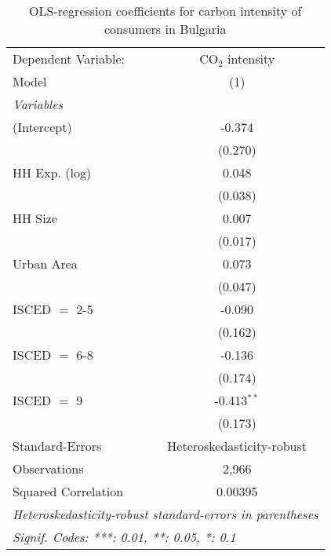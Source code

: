 
\begin{table}[htbp!]
   \centering
   \small
   \begin{adjustbox}{width = 1\textwidth, max height = 0.95\textheight, center}
      \begin{threeparttable}[b]
         \caption{\label{tab:OLS_1_BGR} OLS-regression coefficients for carbon intensity of consumers in Bulgaria}
         \begin{tabular}{lc}
            \tabularnewline \midrule \midrule
            Dependent Variable: & CO$_{2}$ intensity\\  
            Model               & (1)\\  
            \midrule
            \emph{Variables}\\
            (Intercept)         & -0.374\\   
                                & (0.270)\\   
            HH Exp. (log)       & 0.048\\   
                                & (0.038)\\   
            HH Size             & 0.007\\   
                                & (0.017)\\   
            Urban Area          & 0.073\\   
                                & (0.047)\\   
            ISCED $=$ 2-5       & -0.090\\   
                                & (0.162)\\   
            ISCED $=$ 6-8       & -0.136\\   
                                & (0.174)\\   
            ISCED $=$ 9         & -0.413$^{**}$\\   
                                & (0.173)\\   
            \midrule 
            Standard-Errors     & Heteroskedasticity-robust \\   
            Observations        & 2,966\\  
            Squared Correlation & 0.00395\\  
            \midrule \midrule
            \multicolumn{2}{l}{\emph{Heteroskedasticity-robust standard-errors in parentheses}}\\
            \multicolumn{2}{l}{\emph{Signif. Codes: ***: 0.01, **: 0.05, *: 0.1}}\\
         \end{tabular}
         

\end{threeparttable}
\end{adjustbox}
\end{table}
